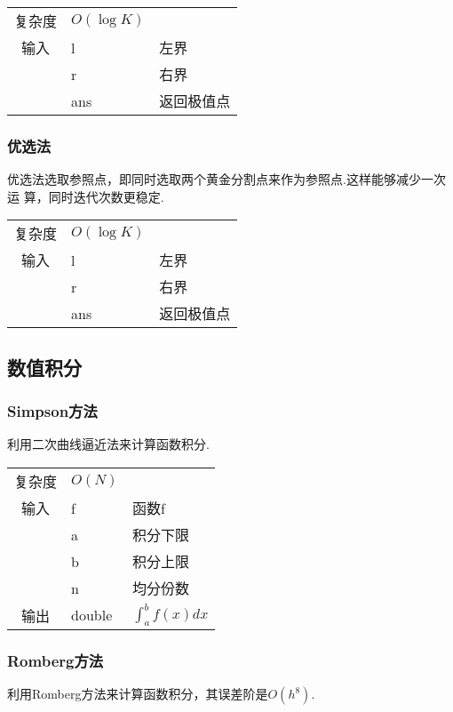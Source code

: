 \begin{longtable}{|c|l|l|}
复杂度 & $O(\log K)$ &  \\
输入 & l & 左界 \\
 & r & 右界 \\
 & ans & 返回极值点 \\ 
\end{longtable}



        \subsubsection{优选法}\small
优选法选取参照点，即同时选取两个黄金分割点来作为参照点.这样能够减少一次运
算，同时迭代次数更稳定.

\begin{longtable}{|c|l|l|}
复杂度 & $O(\log K)$ &  \\
输入 & l & 左界 \\
 & r & 右界 \\
 & ans & 返回极值点 \\ 
\end{longtable}



    \subsection{数值积分}\small
        \subsubsection{Simpson方法}\small
利用二次曲线逼近法来计算函数积分.

\begin{longtable}{|c|l|l|}
复杂度 & $O(N)$ &  \\
输入 & f & 函数f \\
 & a & 积分下限 \\
 & b & 积分上限 \\
 & n & 均分份数 \\ 
输出 & double & $\int_{a} ^{b} f(x)  dx$ \\ 
\end{longtable}



        \subsubsection{Romberg方法}\small
利用Romberg方法来计算函数积分，其误差阶是$O(h^8)$.

